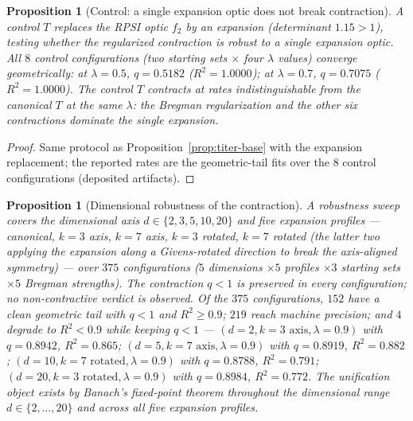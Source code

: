 \documentclass[11pt,a4paper]{article}
\theoremstyle{plain}
\newtheorem{proposition}[theorem]{Proposition}
\theoremstyle{definition}
\theoremstyle{remark}
\begin{document}
\begin{proposition}[Control: a single expansion optic does not
break contraction]\label{prop:titer-control}
A control $T$ replaces the RPSI optic $f_2$ by an expansion
(determinant $1.15>1$), testing whether the regularized
contraction is robust to a single expansion optic. All $8$ control
configurations (two starting sets $\times$ four $\lambda$ values)
converge geometrically: at $\lambda=0.5$,
$q=0.5182$ ($R^{2}=1.0000$); at $\lambda=0.7$, $q=0.7075$
($R^{2}=1.0000$). The control $T$ contracts at rates
indistinguishable from the canonical $T$ at the same
$\lambda$: the Bregman regularization and the other six
contractions dominate the single expansion.
\end{proposition}

\begin{proof}
Same protocol as Proposition~\ref{prop:titer-base} with the
expansion replacement; the reported rates are the geometric-tail
fits over the $8$ control configurations (deposited artifacts).
\end{proof}

\begin{proposition}[Dimensional robustness of the contraction]
\label{prop:titer}
A robustness sweep covers the dimensional axis
$d\in\{2,3,5,10,20\}$ and five expansion profiles --- canonical,
$k{=}3$ axis, $k{=}7$ axis, $k{=}3$ rotated, $k{=}7$ rotated (the
latter two applying the expansion along a Givens-rotated direction
to break the axis-aligned symmetry) --- over $375$
configurations ($5$ dimensions $\times5$ profiles $\times3$
starting sets $\times5$ Bregman strengths). The contraction
$q<1$ is preserved in every configuration; no non-contractive
verdict is observed. Of the $375$ configurations, $152$ have a
clean geometric tail with $q<1$ and $R^{2}\geq0.9$; $219$ reach
machine precision; and $4$ degrade to $R^{2}<0.9$ while keeping
$q<1$ --- $(d{=}2,k{=}3\text{ axis},\lambda{=}0.9)$ with
$q=0.8942$, $R^{2}=0.865$; $(d{=}5,k{=}7\text{ axis},
\lambda{=}0.9)$ with $q=0.8919$, $R^{2}=0.882$;
$(d{=}10,k{=}7\text{ rotated},\lambda{=}0.9)$ with $q=0.8788$,
$R^{2}=0.791$; $(d{=}20,k{=}3\text{ rotated},\lambda{=}0.9)$ with
$q=0.8984$, $R^{2}=0.772$. The unification object exists by
Banach's fixed-point theorem throughout the dimensional range
$d\in\{2,\ldots,20\}$ and across all five expansion profiles.
\end{proposition}
\end{document}
